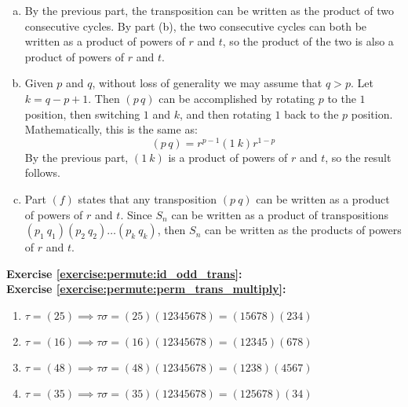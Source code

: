 \begin{enumerate}[(a)]
\item
By the previous part, the transposition can be written as the product of two consecutive cycles. By part (b), the two consecutive cycles can both be written as a  product of powers of $r$ and $t$, so the product of the two is also a product of powers of $r$ and $t$.
\item
Given $p$ and $q$, without loss of generality we may assume that $q>p$.  Let $k=q-p+1$.  Then $(p \, q)$ can be accomplished by rotating $p$ to the $1$ position, then switching $1$ and $k$, and then rotating $1$ back to the $p$ position.  Mathematically, this is the same as:
\begin{equation*}
(p \, q) = r^{p-1}(1\ k)r^{1-p}
\end{equation*}
By the previous part, $(1\ k)$ is a product of powers of $r$ and $t$, so the result follows.
\item
Part $(f)$ states that any transposition $(p\ q)$ can be written as a product of powers of $r$ and $t$. Since $S_{n}$ can be written as a product of transpositions $(p_{1}\ q_{1})(p_{2}\ q_{2})\dots(p_{k}\ q_{k})$, then $S_{n}$ can be written as the products of powers of $r$ and $t$.
\end{enumerate}

\noindent\textbf{Exercise \ref{exercise:permute:id_odd_trans}:}\\

\noindent\textbf{Exercise \ref{exercise:permute:perm_trans_multiply}:}
\begin{enumerate}[{a.}]
\item
$\tau= (25) \implies \tau\sigma = (25)(12345678) = (15678)(234)$

\item
$\tau= (16) \implies \tau\sigma = (16)(12345678) = (12345)(678)$

\item
$\tau=(48) \implies \tau\sigma = (48)(12345678) = (1238)(4567)$

\item
$\tau=(35) \implies \tau\sigma = (35)(12345678) = (125678)(34)$
\end{enumerate}

